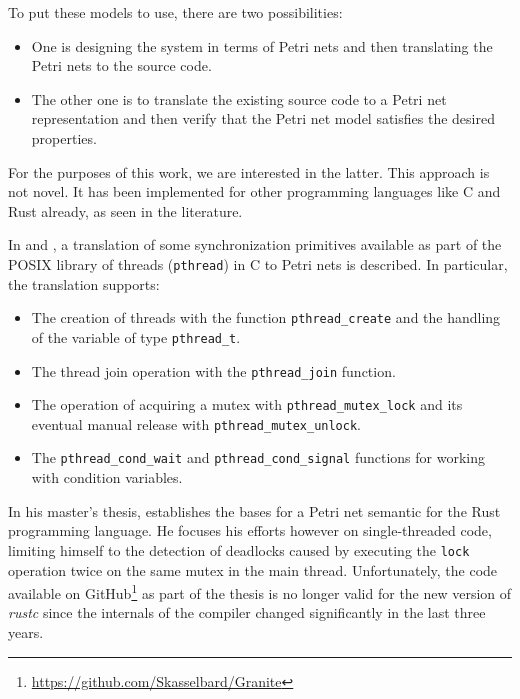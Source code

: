 \documentclass[../Thesis.tex]{subfiles}
\begin{document}
To put these models to use, there are two possibilities:

\begin{itemize}
      \item One is designing the system in terms of Petri nets
            and then translating the Petri nets to the source code.
      \item The other one is to translate the existing source code to a Petri net representation
            and then verify that the Petri net model satisfies the desired properties.
\end{itemize}

For the purposes of this work, we are interested in the latter.
This approach is not novel.
It has been implemented for other programming languages like C and Rust already,
as seen in the literature.

In \cite{kavi2002modeling} and \cite{moshtaghi2001},
a translation of some synchronization primitives available as part of
the POSIX library of threads (\texttt{pthread}) in C to Petri nets is described.
In particular, the translation supports:

\begin{itemize}
      \item The creation of threads with the function \texttt{pthread\_create}
            and the handling of the variable of type \texttt{pthread\_t}.
      \item The thread join operation with the \texttt{pthread\_join} function.
      \item The operation of acquiring a mutex with \texttt{pthread\_mutex\_lock}
            and its eventual manual release with \texttt{pthread\_mutex\_unlock}.
      \item The \texttt{pthread\_cond\_wait} and \texttt{pthread\_cond\_signal} functions
            for working with condition variables.
\end{itemize}

In his master's thesis, \cite{meyer2020} establishes
the bases for a Petri net semantic for the Rust programming language.
He focuses his efforts however on single-threaded code,
limiting himself to the detection of deadlocks caused by
executing the \texttt{lock} operation twice on the same mutex in the main thread.
Unfortunately, the code available on GitHub\footnote{\url{https://github.com/Skasselbard/Granite}}
as part of the thesis is no longer valid for the new version of \emph{rustc}
since the internals of the compiler changed significantly in the last three years.
\end{document}
